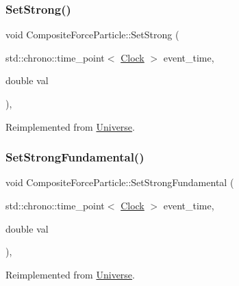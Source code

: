 \subsubsection{\texorpdfstring{Set\+Strong()}{SetStrong()}}
{\footnotesize\ttfamily void Composite\+Force\+Particle\+::\+Set\+Strong (\begin{DoxyParamCaption}\item[{std\+::chrono\+::time\+\_\+point$<$ \mbox{\hyperlink{universe_8h_a0ef8d951d1ca5ab3cfaf7ab4c7a6fd80}{Clock}} $>$}]{event\+\_\+time,  }\item[{double}]{val }\end{DoxyParamCaption})\hspace{0.3cm}{\ttfamily [inline]}, {\ttfamily [virtual]}}



Reimplemented from \mbox{\hyperlink{classUniverse_a5946c8f3d4cda305f3ecd10df21a2f94}{Universe}}.

\mbox{\label{classCompositeForceParticle_a28d835658edcbecf60162475a8cb1ab6}} 
\subsubsection{\texorpdfstring{Set\+Strong\+Fundamental()}{SetStrongFundamental()}}
{\footnotesize\ttfamily void Composite\+Force\+Particle\+::\+Set\+Strong\+Fundamental (\begin{DoxyParamCaption}\item[{std\+::chrono\+::time\+\_\+point$<$ \mbox{\hyperlink{universe_8h_a0ef8d951d1ca5ab3cfaf7ab4c7a6fd80}{Clock}} $>$}]{event\+\_\+time,  }\item[{double}]{val }\end{DoxyParamCaption})\hspace{0.3cm}{\ttfamily [inline]}, {\ttfamily [virtual]}}



Reimplemented from \mbox{\hyperlink{classUniverse_aafec97a231126b71c73ac1258609a284}{Universe}}.

\mbox{\label{classCompositeForceParticle_aeba1070d4ec6e52fd8276e38c6a6c2e1}} 
